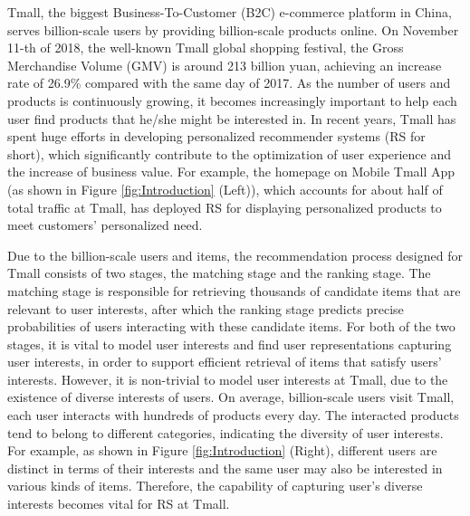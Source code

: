 \documentclass[sigconf]{acmart}
\begin{document}
Tmall, the biggest Business-To-Customer (B2C) e-commerce platform in China, serves billion-scale users by providing billion-scale products online.
On November 11-th of 2018, the well-known Tmall global shopping festival, the Gross Merchandise Volume (GMV) is around 213 billion yuan, achieving an increase rate of 26.9\% compared with the same day of 2017.
As the number of users and products is continuously growing, it becomes increasingly important to help each user find products that he/she might be interested in.
In recent years, Tmall has spent huge efforts in developing personalized recommender systems (RS for short), which significantly contribute to the optimization of user experience and the increase of business value.
For example, the homepage on Mobile Tmall App (as shown in Figure \ref{fig:Introduction} (Left)), which accounts for about half of total traffic at Tmall, has deployed RS for displaying personalized products to meet customers' personalized need.

Due to the billion-scale users and items, the recommendation process designed for Tmall consists of two stages, the matching stage and the ranking stage. The matching stage is responsible for retrieving thousands of candidate items that are relevant to user interests, after which the ranking stage predicts precise probabilities of users interacting with these candidate items.
For both of the two stages, it is vital to model user interests and find user representations capturing user interests, in order to support efficient retrieval of items that satisfy users' interests.
However, it is non-trivial to model user interests at Tmall, due to the existence of diverse interests of users.
On average, billion-scale users visit Tmall, each user interacts with hundreds of products every day.
The interacted products tend to belong to different categories, indicating the diversity of user interests.
For example, as shown in Figure \ref{fig:Introduction} (Right),
different users are distinct in terms of their interests and the same user may also be interested in various kinds of items.
Therefore, the capability of capturing user's diverse interests becomes vital for RS at Tmall.
\end{document}
